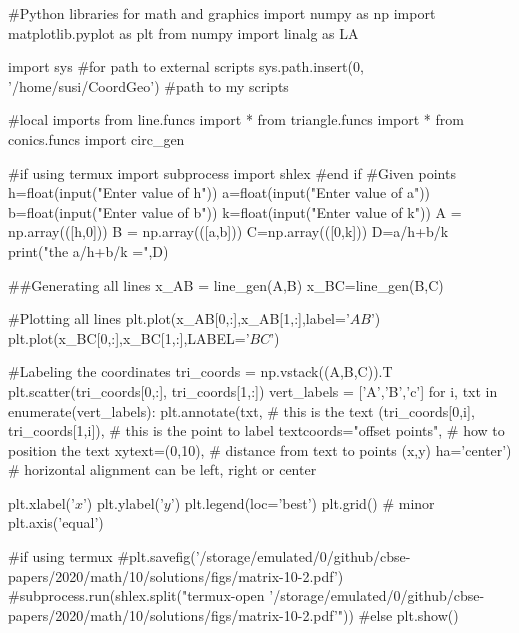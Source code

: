#Python libraries for math and graphics
import numpy as np
import matplotlib.pyplot as plt
from numpy import linalg as LA

import sys                                          #for path to external scripts
sys.path.insert(0, '/home/susi/CoordGeo')        #path to my scripts

#local imports
from line.funcs import *
from triangle.funcs import *
from conics.funcs import circ_gen

#if using termux
import subprocess
import shlex
#end if
#Given points
h=float(input("Enter value of h"))
a=float(input("Enter value of a"))
b=float(input("Enter value of b"))
k=float(input("Enter value of k"))
A = np.array(([h,0]))
B = np.array(([a,b]))
C=np.array(([0,k]))
D=a/h+b/k
print("the a/h+b/k =",D)

##Generating all lines
x_AB = line_gen(A,B)
x_BC=line_gen(B,C)


#Plotting all lines
plt.plot(x_AB[0,:],x_AB[1,:],label='$AB$')
plt.plot(x_BC[0,:],x_BC[1,:],LABEL='$BC$')

#Labeling the coordinates
tri_coords = np.vstack((A,B,C)).T
plt.scatter(tri_coords[0,:], tri_coords[1,:])
vert_labels = ['A','B','c']
for i, txt in enumerate(vert_labels):
    plt.annotate(txt, # this is the text
                 (tri_coords[0,i], tri_coords[1,i]), # this is the point to label
                 textcoords="offset points", # how to position the text
                 xytext=(0,10), # distance from text to points (x,y)
                 ha='center') # horizontal alignment can be left, right or center

plt.xlabel('$x$')
plt.ylabel('$y$')
plt.legend(loc='best')
plt.grid() # minor
plt.axis('equal')

#if using termux
#plt.savefig('/storage/emulated/0/github/cbse-papers/2020/math/10/solutions/figs/matrix-10-2.pdf')
#subprocess.run(shlex.split("termux-open '/storage/emulated/0/github/cbse-papers/2020/math/10/solutions/figs/matrix-10-2.pdf'")) 
#else
plt.show()

